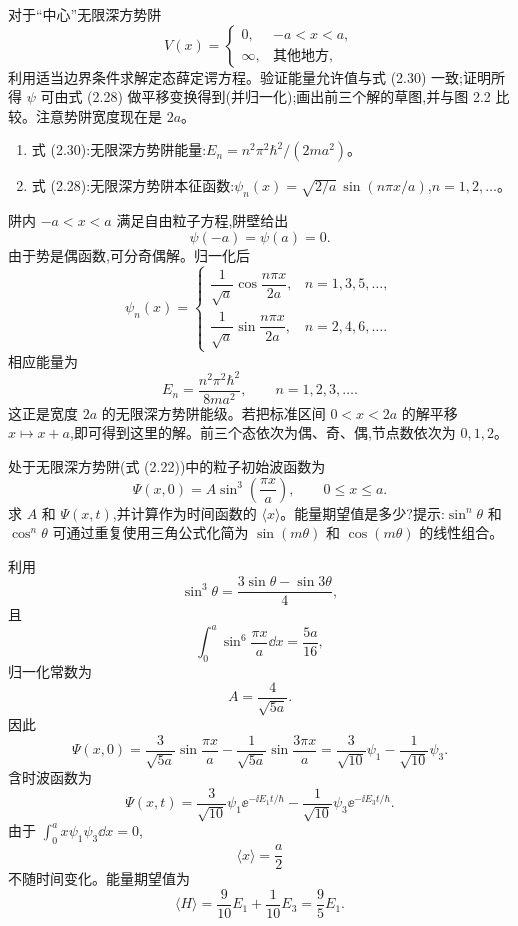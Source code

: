 \begin{question}
对于“中心”无限深方势阱
\[
V(x)=\begin{cases}0,&-a<x<a,\\ \infty,&\text{其他地方},
\end{cases}
\]
利用适当边界条件求解定态薛定谔方程。验证能量允许值与式 (2.30) 一致;证明所得 $\psi$ 可由式 (2.28) 做平移变换得到(并归一化);画出前三个解的草图,并与图 2.2 比较。注意势阱宽度现在是 $2a$。

\par\smallskip
{}
\begin{enumerate}[leftmargin=2.2em,itemsep=0.12em,topsep=0.12em,parsep=0pt]
\item 式 (2.30):无限深方势阱能量:$E_n=n^2\pi^2\hbar^2/(2ma^2)$。
\item 式 (2.28):无限深方势阱本征函数:$\psi_n(x)=\sqrt{2/a}\,\sin(n\pi x/a)$,$n=1,2,\ldots$。
\end{enumerate}

\end{question}
\begin{solution}
阱内 $-a<x<a$ 满足自由粒子方程,阱壁给出
\[
\psi(-a)=\psi(a)=0.
\]
由于势是偶函数,可分奇偶解。归一化后
\[
\psi_n(x)=\begin{cases}
\dfrac1{\sqrt a}\cos\dfrac{n\pi x}{2a},& n=1,3,5,\ldots,\\[0.8em]
\dfrac1{\sqrt a}\sin\dfrac{n\pi x}{2a},& n=2,4,6,\ldots.
\end{cases}
\]
相应能量为
\[
E_n=\frac{n^2\pi^2\hbar^2}{8ma^2},
\qquad n=1,2,3,\ldots.
\]
这正是宽度 $2a$ 的无限深方势阱能级。若把标准区间 $0<x<2a$ 的解平移 $x\mapsto x+a$,即可得到这里的解。前三个态依次为偶、奇、偶,节点数依次为 $0,1,2$。
\end{solution}

\begin{question}
处于无限深方势阱(式 (2.22))中的粒子初始波函数为
\[
\Psi(x,0)=A\sin^3\left(\frac{\pi x}{a}\right),\qquad 0\le x\le a.
\]
求 $A$ 和 $\Psi(x,t)$,并计算作为时间函数的 $\langle x\rangle$。能量期望值是多少?提示:$\sin^n\theta$ 和 $\cos^n\theta$ 可通过重复使用三角公式化简为 $\sin(m\theta)$ 和 $\cos(m\theta)$ 的线性组合。

\par\smallskip
{}

\end{question}
\begin{solution}
利用
\[
\sin^3\theta=\frac{3\sin\theta-\sin3\theta}{4},
\]
且
\[
\int_0^a\sin^6\frac{\pi x}{a}\dd x=\frac{5a}{16},
\]
归一化常数为
\[
A=\frac4{\sqrt{5a}}.
\]
因此
\[
\Psi(x,0)=\frac{3}{\sqrt{5a}}\sin\frac{\pi x}{a}-\frac1{\sqrt{5a}}\sin\frac{3\pi x}{a}
=\frac3{\sqrt{10}}\psi_1-\frac1{\sqrt{10}}\psi_3.
\]
含时波函数为
\[
\Psi(x,t)=\frac3{\sqrt{10}}\psi_1\ee^{-\ii E_1t/\hbar}
-\frac1{\sqrt{10}}\psi_3\ee^{-\ii E_3t/\hbar}.
\]
由于 $\int_0^a x\psi_1\psi_3\dd x=0$,
\[
\langle x\rangle=\frac{a}{2}
\]
不随时间变化。能量期望值为
\[
\langle H\rangle=\frac9{10}E_1+\frac1{10}E_3
=\frac95E_1.
\]
\end{solution}

